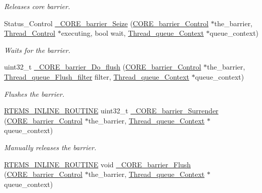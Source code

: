 \begin{DoxyCompactItemize}
\begin{DoxyCompactList}\small\item\em Releases core barrier. \end{DoxyCompactList}\item 
Status\+\_\+\+Control \mbox{\hyperlink{group__RTEMSScoreBarrier_ga760e64255cc0635768c65b566c536e3e}{\+\_\+\+C\+O\+R\+E\+\_\+barrier\+\_\+\+Seize}} (\mbox{\hyperlink{structCORE__barrier__Control}{C\+O\+R\+E\+\_\+barrier\+\_\+\+Control}} $\ast$the\+\_\+barrier, \mbox{\hyperlink{struct__Thread__Control}{Thread\+\_\+\+Control}} $\ast$executing, bool wait, \mbox{\hyperlink{structThread__queue__Context}{Thread\+\_\+queue\+\_\+\+Context}} $\ast$queue\+\_\+context)
\begin{DoxyCompactList}\small\item\em Waits for the barrier. \end{DoxyCompactList}\item 
uint32\+\_\+t \mbox{\hyperlink{group__RTEMSScoreBarrier_gaed6c59e37b0d953329d63da8cbdc99ee}{\+\_\+\+C\+O\+R\+E\+\_\+barrier\+\_\+\+Do\+\_\+flush}} (\mbox{\hyperlink{structCORE__barrier__Control}{C\+O\+R\+E\+\_\+barrier\+\_\+\+Control}} $\ast$the\+\_\+barrier, \mbox{\hyperlink{group__RTEMSScoreThreadQueue_ga66aee78bfdca4bd829cdedf18e7c2451}{Thread\+\_\+queue\+\_\+\+Flush\+\_\+filter}} filter, \mbox{\hyperlink{structThread__queue__Context}{Thread\+\_\+queue\+\_\+\+Context}} $\ast$queue\+\_\+context)
\begin{DoxyCompactList}\small\item\em Flushes the barrier. \end{DoxyCompactList}\item 
\mbox{\hyperlink{group__RTEMSScoreBaseDefs_gac216239df231d5dbd15e3520b0b9313f}{R\+T\+E\+M\+S\+\_\+\+I\+N\+L\+I\+N\+E\+\_\+\+R\+O\+U\+T\+I\+NE}} uint32\+\_\+t \mbox{\hyperlink{group__RTEMSScoreBarrier_ga48a6be566a20ba33b62e13b42a3fcb2f}{\+\_\+\+C\+O\+R\+E\+\_\+barrier\+\_\+\+Surrender}} (\mbox{\hyperlink{structCORE__barrier__Control}{C\+O\+R\+E\+\_\+barrier\+\_\+\+Control}} $\ast$the\+\_\+barrier, \mbox{\hyperlink{structThread__queue__Context}{Thread\+\_\+queue\+\_\+\+Context}} $\ast$queue\+\_\+context)
\begin{DoxyCompactList}\small\item\em Manually releases the barrier. \end{DoxyCompactList}\item 
\mbox{\hyperlink{group__RTEMSScoreBaseDefs_gac216239df231d5dbd15e3520b0b9313f}{R\+T\+E\+M\+S\+\_\+\+I\+N\+L\+I\+N\+E\+\_\+\+R\+O\+U\+T\+I\+NE}} void \mbox{\hyperlink{group__RTEMSScoreBarrier_gafcb133664639142f1866dd37ec20a56a}{\+\_\+\+C\+O\+R\+E\+\_\+barrier\+\_\+\+Flush}} (\mbox{\hyperlink{structCORE__barrier__Control}{C\+O\+R\+E\+\_\+barrier\+\_\+\+Control}} $\ast$the\+\_\+barrier, \mbox{\hyperlink{structThread__queue__Context}{Thread\+\_\+queue\+\_\+\+Context}} $\ast$queue\+\_\+context)

\end{DoxyCompactItemize}
